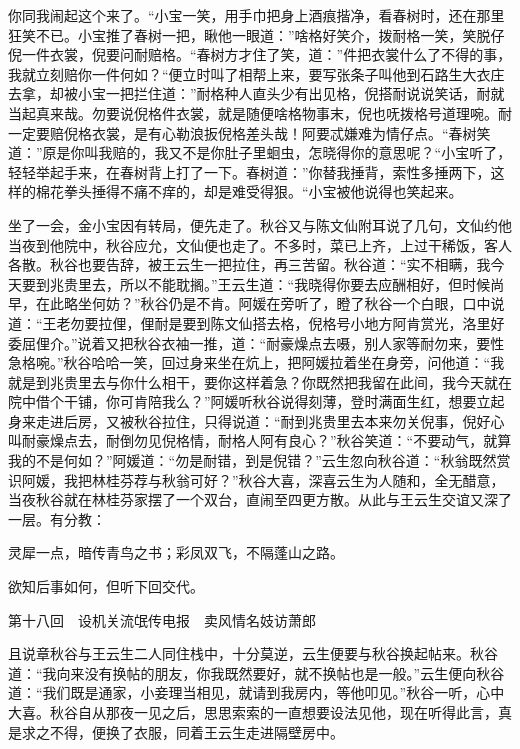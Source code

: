 \documentclass[12pt,UTF8]{ctexbook}
\begin{document}
{{{你同我闹起这个来了。“小宝一笑，用手巾把身上酒痕揩净，看春树时，还在那里狂笑不已。小宝推了春树一把，瞅他一眼道：”啥格好笑介，拨耐格一笑，笑脱仔倪一件衣裳，倪要问耐赔格。“春树方才住了笑，道：”件把衣裳什么了不得的事，我就立刻赔你一件何如？“便立时叫了相帮上来，要写张条子叫他到石路生大衣庄去拿，却被小宝一把拦住道：”耐格种人直头少有出见格，倪搭耐说说笑话，耐就当起真来哉。勿要说倪格件衣裳，就是随便啥格物事末，倪也呒拨格号道理啘。耐一定要赔倪格衣裳，是有心勒浪扳倪格差头哉！阿要忒嫌难为情仔点。“春树笑道：”原是你叫我赔的，我又不是你肚子里蛔虫，怎晓得你的意思呢？“小宝听了，轻轻举起手来，在春树背上打了一下。春树道：”你替我捶背，索性多捶两下，这样的棉花拳头捶得不痛不痒的，却是难受得狠。“小宝被他说得也笑起来。

坐了一会，金小宝因有转局，便先走了。秋谷又与陈文仙附耳说了几句，文仙约他当夜到他院中，秋谷应允，文仙便也走了。不多时，菜已上齐，上过干稀饭，客人各散。秋谷也要告辞，被王云生一把拉住，再三苦留。秋谷道：“实不相瞒，我今天要到兆贵里去，所以不能耽搁。”王云生道：“我晓得你要去应酬相好，但时候尚早，在此略坐何妨？”秋谷仍是不肯。阿媛在旁听了，瞪了秋谷一个白眼，口中说道：“王老勿要拉俚，俚耐是要到陈文仙搭去格，倪格号小地方阿肯赏光，洛里好委屈俚介。”说着又把秋谷衣袖一推，道：“耐豪燥点去嗫，别人家等耐勿来，要性急格啘。”秋谷哈哈一笑，回过身来坐在炕上，把阿媛拉着坐在身旁，问他道：“我就是到兆贵里去与你什么相干，要你这样着急？你既然把我留在此间，我今天就在院中借个干铺，你可肯陪我么？”阿媛听秋谷说得刻薄，登时满面生红，想要立起身来走进后房，又被秋谷拉住，只得说道：“耐到兆贵里去本来勿关倪事，倪好心叫耐豪燥点去，耐倒勿见倪格情，耐格人阿有良心？”秋谷笑道：“不要动气，就算我的不是何如？”阿媛道：“勿是耐错，到是倪错？”云生忽向秋谷道：“秋翁既然赏识阿媛，我把林桂芬荐与秋翁可好？”秋谷大喜，深喜云生为人随和，全无醋意，当夜秋谷就在林桂芬家摆了一个双台，直闹至四更方散。从此与王云生交谊又深了一层。有分教：

灵犀一点，暗传青鸟之书；彩凤双飞，不隔蓬山之路。

欲知后事如何，但听下回交代。





第十八回　设机关流氓传电报　卖风情名妓访萧郎





且说章秋谷与王云生二人同住栈中，十分莫逆，云生便要与秋谷换起帖来。秋谷道：“我向来没有换帖的朋友，你我既然要好，就不换帖也是一般。”云生便向秋谷道：“我们既是通家，小妾理当相见，就请到我房内，等他叩见。”秋谷一听，心中大喜。秋谷自从那夜一见之后，思思索索的一直想要设法见他，现在听得此言，真是求之不得，便换了衣服，同着王云生走进隔壁房中。

}}}
\end{document}
